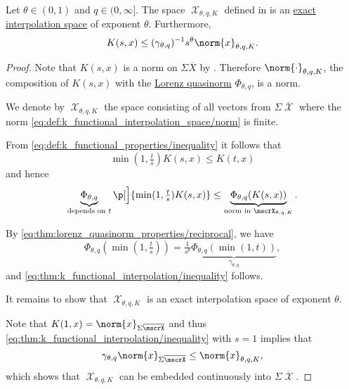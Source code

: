 \begin{theorem}\label{thm:k_functional_interpolation}\mcite\cite[thm. 3.1.2]{Bergh1976}
  Let \( \theta \in (0, 1) \) and \( q \in (0, \infty] \). The space \( \mscrX_{\theta,q,K} \) defined in  is an \hyperref[def:banach_interpolation_space_exponent]{exact interpolation space} of exponent \( \theta \). Furthermore,
  \begin{equation}\label{eq:thm:k_functional_interpolation/inequality}
    K(s, x) \leq (\gamma_{\theta,q})^{-1} s^\theta \norm{x}_{\theta,q,K}.
  \end{equation}
\end{theorem}
\begin{proof}
  Note that \( K(s, x) \) is a norm on \( \Sigma \overline{X} \) by . Therefore \( \norm{\cdot}_{\theta,q,K} \), the composition of \( K(s, x) \) with the \hyperref[def:lorenz_quasinorm]{Lorenz quasinorm} \( \Phi_{\theta,q} \), is a norm.

  We denote by \( \mscrX_{\theta,q,K} \) the space consisting of all vectors from \( \Sigma \overline{\mscrX} \) where the norm \eqref{eq:def:k_functional_interpolation_space/norm} is finite.

  From \eqref{eq:def:k_functional_properties/inequality} it follows that
  \begin{equation*}
    \min(1, \tfrac t s) K(s, x) \leq K(t, x)
  \end{equation*}
  and hence
  \begin{equation*}
    \underbrace{\Phi_{\theta,q}}_{\text{depends on } t} \p[\Big]{ \min(1, \tfrac t s) K(s, x) } \leq \underbrace{\Phi_{\theta,q}(K(s, x))}_{\text{norm in } \mscrX_{\theta,q,K}}.
  \end{equation*}

  By \eqref{eq:thm:lorenz_quasinorm_properties/reciprocal}, we have
  \begin{equation*}
    \Phi_{\theta,q}(\min(1, \tfrac t s)) = \tfrac 1 {s^\theta} \underbrace{\Phi_{\theta,q}(\min(1, t))}_{\hyperref[eq:def:lorenz_quasinorm/gamma]{\gamma_{\theta,q}}},
  \end{equation*}
  and \eqref{eq:thm:k_functional_interpolation/inequality} follows.

  It remains to show that \( \mscrX_{\theta,q,K} \) is an exact interpolation space of exponent \( \theta \).

  Note that \( K(1, x) = \norm{x}_{\Sigma \overline{\mscrX}} \) and thus \eqref{eq:thm:k_functional_interpolation/inequality} with \( s = 1 \) implies that
  \begin{equation*}
    \gamma_{\theta,q} \norm{x}_{\Sigma \overline{\mscrX}} \leq \norm{x}_{\theta,q,K},
  \end{equation*}
  which shows that \( \mscrX_{\theta,q,K} \) can be embedded continuously into \( \Sigma \overline{\mscrX} \).


\end{proof}
